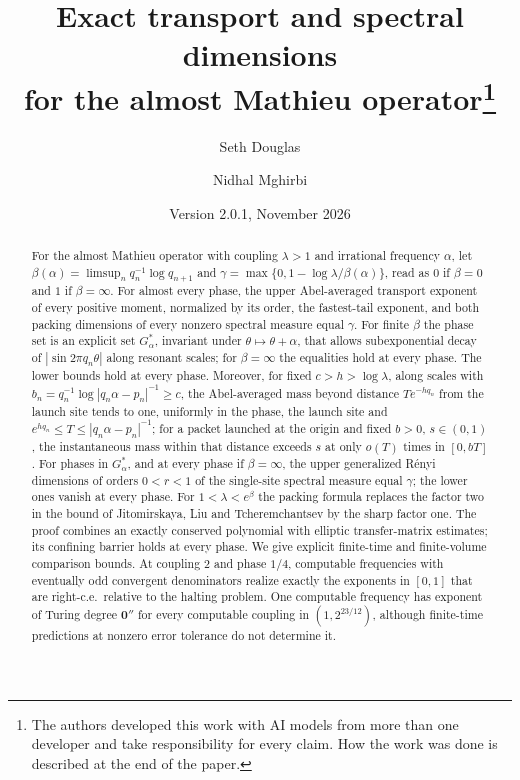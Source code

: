 \documentclass[11pt]{article}
\title{Exact transport and spectral dimensions\\ for the almost Mathieu operator\thanks{The authors developed this work with AI models from more than one developer and take responsibility for every claim. How the work was done is described at the end of the paper.}}
\author{Seth Douglas \and Nidhal Mghirbi}
\date{Version 2.0.1, November 2026}
\theoremstyle{definition}
\begin{document}
\maketitle
\begin{abstract}
For the almost Mathieu operator with coupling $\lambda>1$ and irrational frequency $\alpha$, let $\beta(\alpha)=\limsup_nq_n^{-1}\log q_{n+1}$ and $\gamma=\max\{0,1-\log\lambda/\beta(\alpha)\}$, read as $0$ if $\beta=0$ and $1$ if $\beta=\infty$. For almost every phase, the upper Abel-averaged transport exponent of every positive moment, normalized by its order, the fastest-tail exponent, and both packing dimensions of every nonzero spectral measure equal $\gamma$. For finite $\beta$ the phase set is an explicit set $G_\alpha^*$, invariant under $\theta\mapsto\theta+\alpha$, that allows subexponential decay of $|\sin2\pi q_n\theta|$ along resonant scales; for $\beta=\infty$ the equalities hold at every phase. The lower bounds hold at every phase. Moreover, for fixed $c>h>\log\lambda$, along scales with $b_n=q_n^{-1}\log|q_n\alpha-p_n|^{-1}\ge c$, the Abel-averaged mass beyond distance $Te^{-hq_n}$ from the launch site tends to one, uniformly in the phase, the launch site and $e^{hq_n}\le T\le|q_n\alpha-p_n|^{-1}$; for a packet launched at the origin and fixed $b>0$, $s\in(0,1)$, the instantaneous mass within that distance exceeds $s$ at only $o(T)$ times in $[0,bT]$. For phases in $G_\alpha^*$, and at every phase if $\beta=\infty$, the upper generalized R\'enyi dimensions of orders $0<r<1$ of the single-site spectral measure equal $\gamma$; the lower ones vanish at every phase. For $1<\lambda<e^\beta$ the packing formula replaces the factor two in the bound of Jitomirskaya, Liu and Tcheremchantsev by the sharp factor one. The proof combines an exactly conserved polynomial with elliptic transfer-matrix estimates; its confining barrier holds at every phase. We give explicit finite-time and finite-volume comparison bounds. At coupling $2$ and phase $1/4$, computable frequencies with eventually odd convergent denominators realize exactly the exponents in $[0,1]$ that are right-c.e.\ relative to the halting problem. One computable frequency has exponent of Turing degree $\mathbf0''$ for every computable coupling in $(1,2^{23/12})$, although finite-time predictions at nonzero error tolerance do not determine it.
\end{abstract}




















\end{document}
